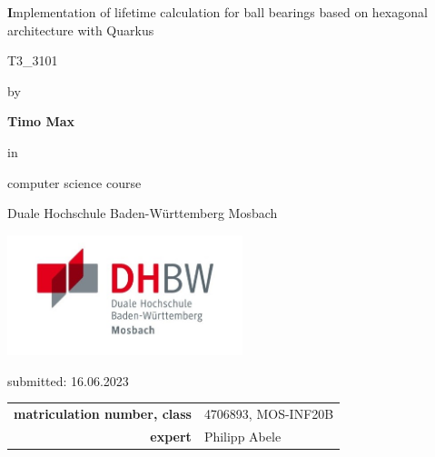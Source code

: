 \def\title{Implementation of lifetime calculation for ball bearings based on hexagonal architecture with Quarkus}
\def\abgabe{16.06.2023}

\begin{titlepage}
	
	
	
	\vspace{5pt}
	
	\begin{center}
		
		\Large \textbf\title
		
		\vspace{50pt}
		
		\large T3\_3101
		
		by 
		
		\large \textbf{Timo Max} 
		
		\vspace{15pt}
		
		in 
		
		\large computer science course
		
		Duale Hochschule Baden-Württemberg Mosbach

        \vspace{10pt}

        \includegraphics[height=3.5cm]{images/dhbw-logo.jpg}
		
		\vspace{20pt}
		
		\large submitted: \abgabe
		
		\vspace{30pt}

		
		\begin{table}[h]
			\centering
			\begin{tabular}{r l}
				\large\textbf{matriculation number, class} & \large 4706893, MOS-INF20B \\
                \large\textbf{expert} & \large Philipp Abele \\
			\end{tabular}
			
		\end{table}
		
	\end{center}
	
	
\end{titlepage}